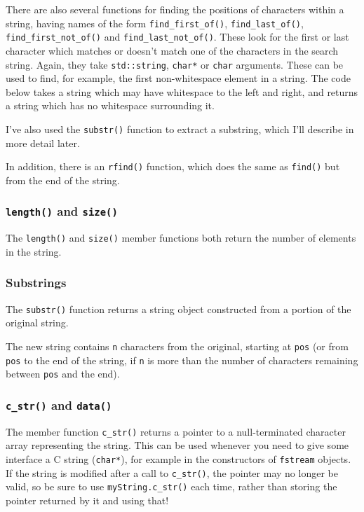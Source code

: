 \documentclass[a4paper]{scrartcl}
\begin{document}
There are also several functions for finding the positions of characters within a string, having names of the form \texttt{find\_first\_of()}, \texttt{find\_last\_of()}, \texttt{find\_first\_not\_of()} and \texttt{find\_last\_not\_of()}. These look for the first or last character which matches or doesn't match one of the characters in the search string. Again, they take \texttt{std::string}, \texttt{char*} or \texttt{char} arguments. These can be used to find, for example, the first non-whitespace element in a string. The code below takes a string which may have whitespace to the left and right, and returns a string which has no whitespace surrounding it.


I've also used the \texttt{substr()} function to extract a substring, which I'll describe in more detail later.

In addition, there is an \texttt{rfind()} function, which does the same as \texttt{find()} but from the end of the string.

\subsubsection{\texttt{length()} and \texttt{size()}}
The \texttt{length()} and \texttt{size()} member functions both return the number of elements in the string.

\subsubsection{Substrings}
The \texttt{substr()} function returns a string object constructed from a portion of the original string.


The new string contains \texttt{n} characters from the original, starting at \texttt{pos} (or from \texttt{pos} to the end of the string, if \texttt{n} is more than the number of characters remaining between \texttt{pos} and the end).

\subsubsection{\texttt{c\_str()} and \texttt{data()}}
The member function \texttt{c\_str()} returns a pointer to a null-terminated character array representing the string. This can be used whenever you need to give some interface a C string (\texttt{char*}), for example in the constructors of \texttt{fstream} objects. If the string is modified after a call to \texttt{c\_str()}, the pointer may no longer be valid, so be sure to use \texttt{myString.c\_str()} each time, rather than storing the pointer returned by it and using that!
\end{document}
